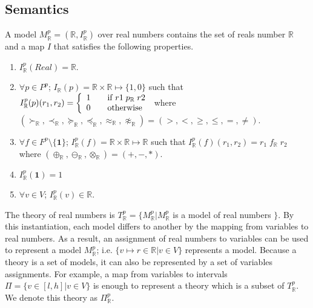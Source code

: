\subsection{Semantics}
A model $M^p_{\mathbb{R}} = (\mathbb{R}, I^p_{\mathbb{R}})$ over real numbers contains the set of reals number $\mathbb{R}$ and a map $I$ that satisfies the following properties.
\begin{enumerate}
\item $I^p_{\mathbb{R}}(Real) = \mathbb{R}$.
\item $\forall p \in P^p$; $I_{\mathbb{R}}(p) = \mathbb{R} \times \mathbb{R} \mapsto \{1, 0\}$ such that $ I_\mathbb{R}^p(p)(r_1, r_2) = \left\{ 
  \begin{array}{c l}
    1 & \quad \text{if } r1 \; p_{\mathbb{R}} \; r2\\
    0 & \quad \text{otherwise }\\
  \end{array} \right.$ where $(\succ_\mathbb{R}, \prec_{\mathbb{R}},\succeq_\mathbb{R},\preceq_{\mathbb{R}}, \approx_\mathbb{R}, \not\approx_\mathbb{R}) = (>, <, \ge, \le, =, \neq)$.
\item $\forall f \in F^p \setminus \{\mathbf{1}\}$; $I^p_{\mathbb{R}}(f) = \mathbb{R} \times \mathbb{R} \mapsto \mathbb{R}$ such that $I^p_{\mathbb{R}}(f)(r_1, r_2)  = r_1 \; f_{\mathbb{R}} \; r_2$ where $(\oplus_{\mathbb{R}}, \ominus_{\mathbb{R}}, \otimes_{\mathbb{R}}) = (+, -, *)$.
\item $I^p_\mathbb{R}(\mathbf{1}) = 1$
\item $\forall v \in V$; $I^p_{\mathbb{R}}(v) \in \mathbb{R}$.
\end{enumerate}
The theory of real numbers is $T^p_{\mathbb{R}} = \{M^p_{\mathbb{R}} | M^p_{\mathbb{R}}$ is a model of real numbers $\}$.
By this instantiation, each model differs to another by the mapping from variables to real numbers. As a result, an assignment of real numbers to variables can be used to represent a model $M^p_{\mathbb{R}}$; i.e. $\{v \mapsto r \in \mathbb{R} | v \in V\}$ represents a model. Because a theory is a set of models, it can also be represented by a set of variables assignments. For example, a map from variables to intervals $\Pi = \{v \in [l, h] | v \in V\}$ is enough to represent a theory which is a subset of $T^p_\mathbb{R}$. We denote this theory as $\Pi^p_\mathbb{R}$.

